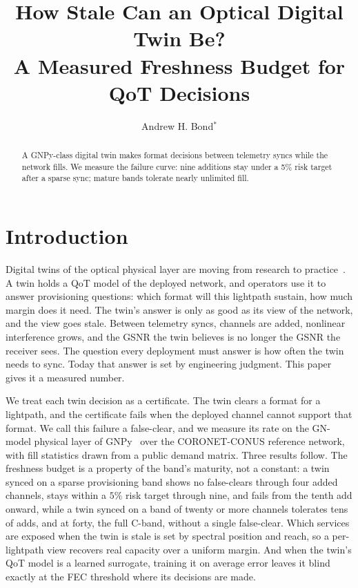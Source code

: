 \documentclass[letterpaper,10pt]{article}
\begin{document}
\title{How Stale Can an Optical Digital Twin Be?\\
A Measured Freshness Budget for QoT Decisions}

\author{Andrew H. Bond$^{*}$}
\address{Department of Computer Engineering, San Jos\'e State University, San Jos\'e, CA 95192, USA}

\begin{abstract}
A GNPy-class digital twin makes format decisions between telemetry syncs while the
network fills. We measure the failure curve: nine additions stay under a 5\% risk
target after a sparse sync; mature bands tolerate nearly unlimited fill.
\end{abstract}

\section{Introduction}
Digital twins of the optical physical layer are moving from research to
practice~\cite{dtwin}. A twin holds a QoT model of the deployed network, and
operators use it to answer provisioning questions: which format will this lightpath
sustain, how much margin does it need. The twin's answer is only as good as its view
of the network, and the view goes stale. Between telemetry syncs, channels are added,
nonlinear interference grows, and the GSNR the twin believes is no longer the GSNR
the receiver sees. The question every deployment must answer is how often the twin
needs to sync. Today that answer is set by engineering judgment. This paper gives it
a measured number.

We treat each twin decision as a certificate. The twin clears a format for a
lightpath, and the certificate fails when the deployed channel cannot support that
format. We call this failure a false-clear, and we measure its rate on the GN-model
physical layer of GNPy~\cite{gnpy} over the CORONET-CONUS reference network, with
fill statistics drawn from a public demand matrix. Three results follow. The
freshness budget is a property of the band's maturity, not a constant: a twin
synced on a sparse provisioning band shows no false-clears through four added
channels, stays within a $5\%$ risk target through nine, and fails from the
tenth add onward, while a twin synced on a band of twenty or more channels
tolerates tens of adds, and at forty, the full C-band, without a single
false-clear. Which services are exposed when the twin is stale is set by
spectral position and reach, so a per-lightpath view recovers real capacity
over a uniform margin. And when the twin's QoT model is a learned surrogate,
training it on average error leaves it blind exactly at the FEC threshold where
its decisions are made.
\end{document}
